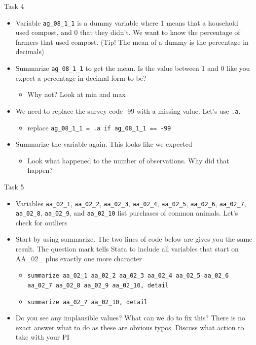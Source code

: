 \documentclass[aspectratio=169]{beamer}
\begin{document}
\begin{frame}{Task 4}
	\begin{itemize}
		\item Variable \texttt{ag\_08\_1\_1} is a dummy variable where 1 means that a household used compost, and 0 that they didn’t. We want to know the percentage of farmers that used compost. (Tip! The mean of a dummy is the percentage in decimals)
		\item Summarize \texttt{ag\_08\_1\_1} to get the mean. Is the value between 1 and 0 like you expect a percentage in decimal form to be?
			\begin{itemize}
				\item Why not? Look at min and max
			\end{itemize}
		\item We need to replace the survey code -99 with a missing value. Let’s use \texttt{.a}.
			\begin{itemize}
				\item replace \texttt{ag\_08\_1\_1 = .a if ag\_08\_1\_1 == -99}
			\end{itemize}
		\item Summarize the variable again. This looks like we expected
			\begin{itemize}
				\item Look what happened to the number of observations. Why did that happen?
			\end{itemize}
	\end{itemize}
\end{frame}

\begin{frame}{Task 5}
	\begin{itemize}
		\item Variables \texttt{aa\_02\_1}, \texttt{aa\_02\_2}, \texttt{aa\_02\_3}, \texttt{aa\_02\_4}, \texttt{aa\_02\_5}, \texttt{aa\_02\_6}, \texttt{aa\_02\_7}, \texttt{aa\_02\_8}, \texttt{aa\_02\_9}, and \texttt{aa\_02\_10} list purchases of common animals. Let’s check for outliers
		\item Start by using summarize. The two lines of code below are gives you the same result. The question mark tells Stata to include all variables that start on AA\_02\_ plus exactly one more character
		\begin{itemize}
			\item \texttt{summarize aa\_02\_1 aa\_02\_2 aa\_02\_3 aa\_02\_4 aa\_02\_5 aa\_02\_6 aa\_02\_7 aa\_02\_8 aa\_02\_9 aa\_02\_10, detail}
			\item \texttt{summarize aa\_02\_? aa\_02\_10, detail}
		\end{itemize}
		\item Do you see any implausible values? What can we do to fix this? There is no exact answer what to do as these are obvious typos. Discuss what action to take with your PI
	\end{itemize}
\end{frame}
\end{document}
